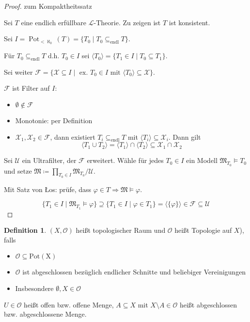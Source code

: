 \documentclass[12pt,parskip=full]{scrartcl}
\theoremstyle{definition}
\newtheorem{definition}[theorem]{Definition}
\begin{document}
	\begin{proof} zum Kompaktheitssatz
		
		Sei $T$ eine endlich erfüllbare $\mathcal{L}$-Theorie. Zu zeigen ist $T$ ist konsistent.
		
		Sei $I = \operatorname{Pot}_{<\aleph_0}(T) = \{ T_0 \mid T_0 \subseteq_\text{endl} T \}$.
		
		Für $T_0 \subseteq_\text{endl} T$ d.h. $T_0 \in I$ sei $\langle T_0 \rangle = \{ T_1 \in I \mid T_0 \subseteq T_1 \}$.
		
		Sei weiter $\mathcal{F} = \{ \mathcal{X} \subseteq I \mid \text{ ex. $T_0 \in I$ mit } \langle T_0 \rangle \subseteq \mathcal{X} \}$.
		
		$\mathcal{F}$ ist Filter auf $I$:
		\begin{itemize}
			\item $\emptyset \notin \mathcal{F}$
			\item Monotonie: per Definition
			\item $\mathcal{X}_1, \mathcal{X}_2 \in \mathcal{F}$, dann existiert $T_i \subseteq_\text{endl} T$ mit $\langle T_i \rangle \subseteq \mathcal{X}_i$. Dann gilt
			\begin{equation*}
				\langle T_1 \cup T_2 \rangle = \langle T_1 \rangle \cap \langle T_2 \rangle \subseteq \mathcal{X}_1 \cap \mathcal{X}_2
			\end{equation*}
		\end{itemize}
	
		Sei $\mathcal{U}$ ein Ultrafilter, der $\mathcal{F}$ erweitert. Wähle für jedes $T_0 \in I$ ein Modell $\mathfrak{M}_{T_0} \models T_0$ und setze $\mathfrak{M} \coloneqq \prod_{T_0 \in I} \mathfrak{M}_{T_0} / \mathcal{U}$.
		
		Mit Satz von \L os: prüfe, dass $\varphi \in T \Rightarrow \mathfrak{M} \models \varphi$.
		
		\begin{equation*}
			\{ T_1 \in I \mid \mathfrak{M}_{T_1} \models \varphi \} \supseteq \{ T_1 \in I \mid \varphi \in T_1 \} = \langle \{ \varphi \} \rangle \in \mathcal{F} \subseteq \mathcal{U}
		\end{equation*}
	\end{proof}

	\begin{definition}
		$(X, \mathcal{O})$ heißt topologischer Raum und $\mathcal{O}$ heißt Topologie auf $X$), falls
		\begin{itemize}
			\item $\mathcal{O} \subseteq \operatorname{Pot(X)}$
			\item $\mathcal{O}$ ist abgeschlossen bezüglich endlicher Schnitte und beliebiger Vereinigungen
			\item Insbesondere $\emptyset, X \in \mathcal{O}$
		\end{itemize}
	
		$U \in \mathcal{O}$ heißt offen bzw. offene Menge, $A \subseteq X$ mit $X \setminus A \in \mathcal{O}$ heißt abgeschlossen bzw. abgeschlossene Menge.
	\end{definition}
\end{document}
